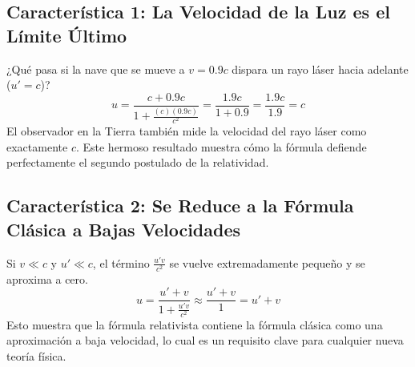 \documentclass[11pt,a4paper]{article}
\begin{document}
\subsection{Característica 1: La Velocidad de la Luz es el Límite Último}
¿Qué pasa si la nave que se mueve a $v=0.9c$ dispara un rayo láser hacia adelante ($u'=c$)?
\[ u = \frac{c + 0.9c}{1 + \frac{(c)(0.9c)}{c^2}} = \frac{1.9c}{1 + 0.9} = \frac{1.9c}{1.9} = c \]
El observador en la Tierra también mide la velocidad del rayo láser como exactamente $c$. Este hermoso resultado muestra cómo la fórmula defiende perfectamente el segundo postulado de la relatividad.

\subsection{Característica 2: Se Reduce a la Fórmula Clásica a Bajas Velocidades}
Si $v \ll c$ y $u' \ll c$, el término $\frac{u'v}{c^2}$ se vuelve extremadamente pequeño y se aproxima a cero.
\[ u = \frac{u' + v}{1 + \frac{u'v}{c^2}} \approx \frac{u' + v}{1} = u' + v \]
Esto muestra que la fórmula relativista contiene la fórmula clásica como una aproximación a baja velocidad, lo cual es un requisito clave para cualquier nueva teoría física.
\end{document}
